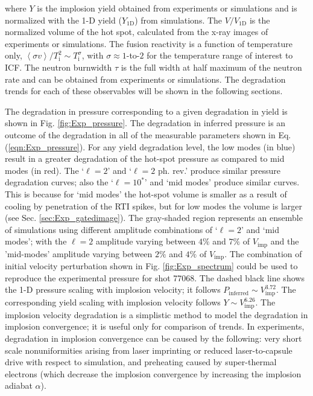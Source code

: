 \documentclass[aip,reprint]{revtex4-1}
\begin{document}
%
%
where $Y$ is the implosion yield obtained from experiments or simulations and is normalized with the 1-D yield ($Y_\text{1D}$) from simulations. The $V/V_\text{1D}$ is the normalized volume of the hot spot, calculated from the x-ray images of experiments or simulations. The fusion reactivity is a function of temperature only,\cite{Exp_Bosch} $\left< \sigma v \right>/T_\text{i}^2 \sim T_\text{i}^\sigma$, with $\sigma \approx 1$-to-$2$ for the temperature range of interest to ICF. The neutron burnwidth $\tau$ is the full width at half maximum of the neutron rate and can be obtained from experiments or simulations. The degradation trends for each of these observables will be shown in the following sections. 

 The degradation in pressure corresponding to a given degradation in yield is shown in Fig. \ref{fig:Exp_pressure}. The degradation in inferred pressure is an outcome of the degradation in all of the measurable parameters shown in Eq. (\ref{eqn:Exp_pressure}). For any yield degradation level, the low modes (in blue) result in a greater degradation of the hot-spot pressure as compared to mid modes (in red). The `$\ell=2$' and `$\ell=2$ ph. rev.' produce similar pressure degradation curves; also the `$\ell=10^*$' and `mid modes' produce similar curves. This is because for `mid modes' the hot-spot volume is smaller as a result of cooling by penetration of the RTI spikes, but for low modes the volume is larger (see Sec. \ref{sec:Exp_gatedimage}). The gray-shaded region represents an ensemble of simulations using different amplitude combinations of `$\ell=2$' and `mid modes'; with the $\ell=2$ amplitude varying between $4 \%$ and $7\%$ of $V_\text{imp}$ and the 'mid-modes' amplitude varying between $2\%$ and $4\%$ of $V_\text{imp}$. The combination of initial velocity perturbation shown in Fig. \ref{fig:Exp_spectrum} could be used to reproduce the experimental pressure for shot 77068. The dashed black line shows the 1-D pressure scaling with implosion velocity; it follows $P_\text{inferred} \sim V_\text{imp}^{3.72}$. The corresponding yield scaling with implosion velocity follows $Y \sim V_\text{imp}^{6.26}$. The implosion velocity degradation is a simplistic method to model the degradation in implosion convergence; it is useful only for comparison of trends. In experiments, degradation in implosion convergence can be caused by the following: very short scale nonuniformities arising from laser imprinting or reduced laser-to-capsule drive with respect to simulation, and preheating caused by super-thermal electrons (which decrease the implosion convergence by increasing the implosion adiabat $\alpha$). 
\end{document}
